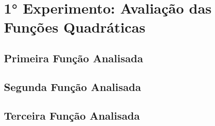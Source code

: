 
\section{1° Experimento: Avaliação das Funções Quadráticas}
    \subsection{Primeira Função Analisada}
         
    \subsection{Segunda Função Analisada}
         
    \subsection{Terceira Função Analisada}
         
\newpage